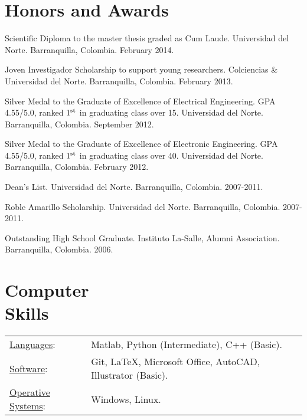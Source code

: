 \documentclass[margin]{res}
\begin{document}
\begin{resume}
\section{Honors and Awards}
Scientific Diploma to the master thesis graded as Cum Laude.
Universidad del Norte. Barranquilla, Colombia. February 2014.

Joven Investigador Scholarship to support young researchers.
Colciencias \& Universidad del Norte. Barranquilla, Colombia. February 2013.

Silver Medal to the Graduate of Excellence of Electrical Engineering.
GPA 4.55/5.0, ranked ${1^{{\rm{st}}}}$ in graduating class over 15.
Universidad del Norte. Barranquilla, Colombia. September 2012.

Silver Medal to the Graduate of Excellence of Electronic Engineering.
GPA 4.55/5.0, ranked ${1^{{\rm{st}}}}$ in graduating class over 40.
Universidad del Norte. Barranquilla, Colombia. February 2012.

Dean's List. Universidad del Norte. Barranquilla, Colombia. 2007-2011.

Roble Amarillo Scholarship. Universidad del Norte. 
Barranquilla, Colombia. 2007-2011.

Outstanding High School Graduate. Instituto La-Salle, Alumni Association.
Barranquilla, Colombia. 2006.


\section{Computer \\ Skills}
   \begin{tabular}{l p{3in}}
    \underline{Languages}: & Matlab, Python (Intermediate), C++ (Basic). \\

    \underline{Software}: & Git, LaTeX, Microsoft Office, AutoCAD, Illustrator (Basic). \\
    
    \underline{Operative Systems}: & Windows, Linux. \\
 \end{tabular}

\end{resume} 
\end{document}
